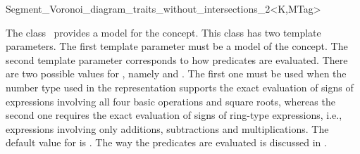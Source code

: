


\begin{ccRefClass}{Segment_Voronoi_diagram_traits_without_intersections_2<K,MTag>}


\ccDefinition
  
The class \ccRefName\ provides a model for the
 concept.
This class has two template parameters. 
The first template parameter must be a model of the 
concept. The second template parameter corresponds to how predicates
are evaluated. There are two possible values for , namely
 and . The first one
must be used when the number type used in the representation supports
the exact evaluation of signs of expressions involving all four basic
operations and square roots, whereas the second one requires the exact
evaluation of signs of ring-type expressions, i.e., expressions
involving only additions, subtractions and multiplications. The
default value for  is .
%
The way the predicates are evaluated is discussed in
\cite{b-ecvdl-96,cgal:k-reisv-04}.



\ccIsModel
{}\\
\\
\\

\ccTypes
{}


\end{ccRefClass}
